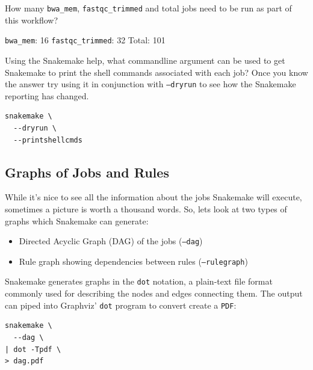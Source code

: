 \begin{questions}

How many \texttt{bwa\_mem}, \texttt{fastqc\_trimmed} and total jobs need to be run as part of this workflow?

\begin{answer}

\texttt{bwa\_mem}: 16
\texttt{fastqc\_trimmed}: 32
Total: 101

\end{answer}

Using the Snakemake help, what commandline argument can be used to get Snakemake to print the shell commands associated with each job? Once you know the answer
try using it in conjunction with \texttt{--dryrun} to see how the Snakemake reporting has changed.

\begin{answer}
\begin{lstlisting}
snakemake \
  --dryrun \
  --printshellcmds
\end{lstlisting}
\end{answer}

\end{questions}

\subsection{Graphs of Jobs and Rules}

While it's nice to see all the information about the jobs Snakemake will execute, sometimes a picture is worth a thousand words. So, lets look at two
types of graphs which Snakemake can generate:

\begin{itemize}
  \item Directed Acyclic Graph (DAG) of the jobs (\texttt{--dag})
  \item Rule graph showing dependencies between rules (\texttt{--rulegraph})
\end{itemize}

Snakemake generates graphs in the \texttt{dot} notation, a plain-text file format commonly used for describing the nodes and edges connecting them. The
output can piped into Graphviz' \texttt{dot} program to convert create a \texttt{PDF}:

\begin{lstlisting}
snakemake \
  --dag \
| dot -Tpdf \
> dag.pdf
\end{lstlisting}

